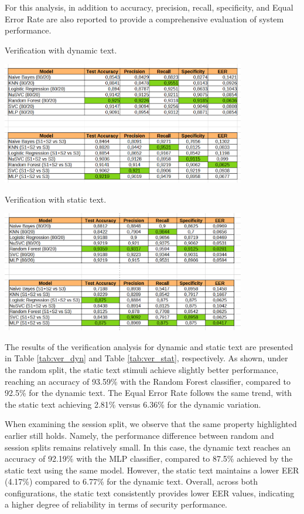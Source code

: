 \documentclass[12pt]{report}
\begin{document}
For this analysis, in addition to accuracy, precision, recall, specificity, and Equal Error Rate are also reported to provide a comprehensive evaluation of system performance.

\begin{table}[ht]
    \centering
    \caption{Verification with dynamic text.}
    \includegraphics[width=0.8\textwidth]{Images/Results/Static_Dynamic/Ver_mov.png}
    \label{tab:ver_dyn}
\end{table}

\begin{table}[ht]
    \centering
    \caption{Verification with static text.}
    \includegraphics[width=0.8\textwidth]{Images/Results/Static_Dynamic/Ver_stat.png}
    \label{tab:ver_stat}
\end{table}


The results of the verification analysis for dynamic and static text are presented in Table \ref{tab:ver_dyn} and Table \ref{tab:ver_stat}, respectively.
As shown, under the random split, the static text stimuli achieve slightly better performance, reaching an accuracy of 93.59\% with the Random Forest classifier, compared to 92.5\% for the dynamic text. 
The Equal Error Rate follows the same trend, with the static text achieving 2.81\% versus 6.36\% for the dynamic variation.

When examining the session split, we observe that the same property highlighted earlier still holds.
Namely, the performance difference between random and session splits remains relatively small.
In this case, the dynamic text reaches an accuracy of 92.19\% with the MLP classifier, compared to 87.5\% achieved by the static text using the same model. 
However, the static text maintains a lower EER (4.17\%) compared to 6.77\% for the dynamic text.
Overall, across both configurations, the static text consistently provides lower EER values, indicating a higher degree of reliability in terms of security performance.
\end{document}
